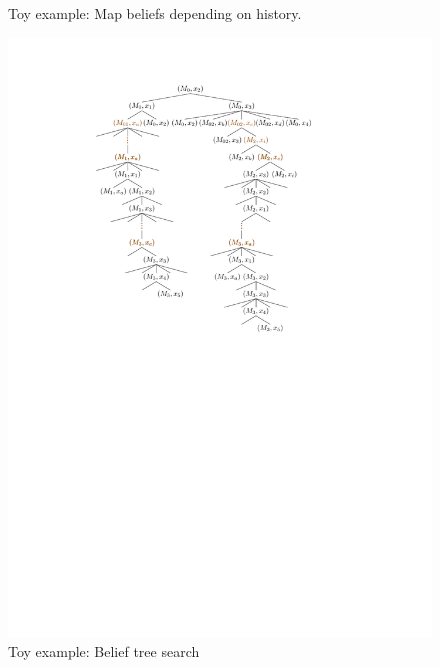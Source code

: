 \documentclass{article}
\begin{document}
\begin{figure}[ht!]
{  }
  \caption{Toy example: Map beliefs depending on history.}
  \label{fig:bts_maps}
\end{figure}
\begin{figure}[ht!]
  \centering
  \includegraphics[width=\columnwidth]{figures/bts_example/bts_example.pdf}
  \caption{Toy example: Belief tree search}
  \label{fig:bts_example}
\end{figure}
\end{document}
